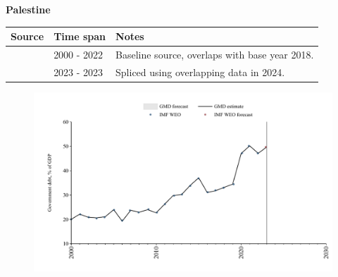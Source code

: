 \documentclass[12pt,a4paper,landscape]{article}
\begin{document}
\begin{adjustbox}{max totalsize={\paperwidth}{\paperheight},center}
\begin{minipage}[t][\textheight][t]{\textwidth}
\vspace*{0.5cm}
{}
\begin{center}
{\Large\bfseries Palestine}
\end{center}
\vspace{0.5cm}
\begin{table}[H]
\centering
\small
\begin{tabular}{|l|l|l|}
\hline
\textbf{Source} & \textbf{Time span} & \textbf{Notes} \\
\hline
\rowcolor{white}\cite{IMF_WEO}& 2000 - 2022 &Baseline source, overlaps with base year 2018.\\
\rowcolor{lightgray}\cite{IMF_WEO_forecast}& 2023 - 2023 &Spliced using overlapping data in 2024.\\
\hline
\end{tabular}
\end{table}
\begin{figure}[H]
\centering
\includegraphics[width=\textwidth,height=0.6\textheight,keepaspectratio]{graphs/PSE_govdebt_GDP.pdf}
\end{figure}
\end{minipage}
\end{adjustbox}
\end{document}
